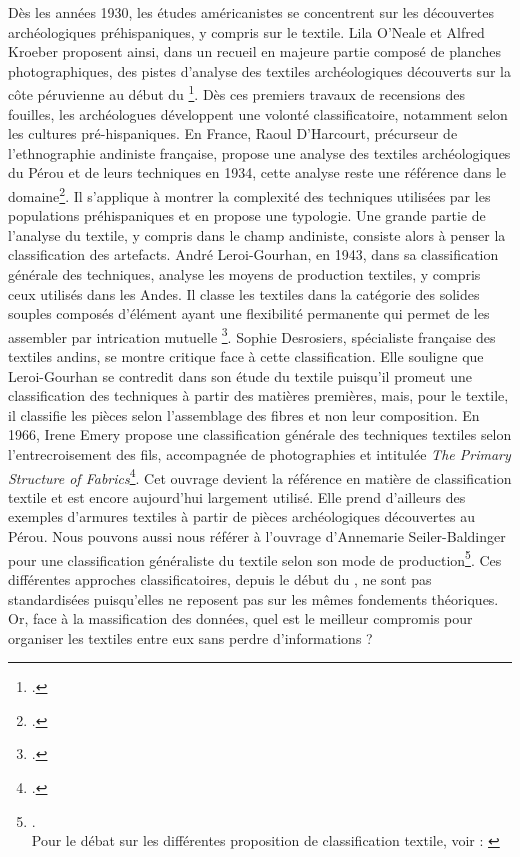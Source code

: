 Dès les années 1930, les études américanistes se concentrent sur les découvertes archéologiques préhispaniques, y compris sur le textile. Lila O'Neale et Alfred Kroeber proposent ainsi, dans un recueil en majeure partie composé de planches photographiques, des pistes d'analyse des textiles archéologiques découverts sur la côte péruvienne au début du \footcite{onealeTextilePeriodsAncient1930}. 
Dès ces premiers travaux de recensions des fouilles, les archéologues développent une volonté classificatoire, notamment selon les cultures pré-hispaniques. En France, Raoul D'Harcourt, précurseur de l'ethnographie andiniste française, propose une analyse des textiles archéologiques du Pérou et de leurs techniques en 1934, cette analyse reste une référence dans le domaine\footcite{harcourtTextilesAnciensPerou2008}. Il s'applique à montrer la complexité des techniques utilisées par les populations préhispaniques et en propose une typologie. Une grande partie de l'analyse du textile, y compris dans le champ andiniste, consiste alors à penser la classification des artefacts. André Leroi-Gourhan, en 1943, dans sa classification générale des techniques, analyse les moyens de production textiles, y compris ceux utilisés dans les Andes. Il classe les textiles dans la catégorie des \og solides souples \fg\:composés d'élément ayant une \og flexibilité permanente qui permet de les assembler par intrication mutuelle \fg \footcite[p.~243]{leroi-gourhanHommeMatiereEvolution1943}. 
Sophie Desrosiers, spécialiste française des textiles andins, se montre critique face à cette classification. Elle souligne que Leroi-Gourhan se contredit dans son étude du textile puisqu'il promeut une classification des techniques à partir des matières premières, mais, pour le textile, il classifie les pièces selon l'assemblage des fibres et non leur composition. En 1966, Irene Emery propose une classification générale des techniques textiles selon l'entrecroisement des fils, accompagnée de photographies et intitulée \textit{The Primary Structure of Fabrics}\footcite{emeryPrimaryStructuresFabrics1995}. Cet ouvrage devient la référence en matière de classification textile et est encore aujourd'hui largement utilisé. Elle prend d'ailleurs des exemples d'armures textiles à partir de pièces archéologiques découvertes au Pérou. Nous pouvons aussi nous référer à l'ouvrage d'Annemarie Seiler-Baldinger pour une classification généraliste du textile selon son mode de production\footnote{\cite{seiler-baldingerTextilesClassificationTechniques1995}.\\Pour le débat sur les différentes proposition de classification textile, voir : \cite{balfetOuSontClassifications1988}}. Ces différentes approches classificatoires, depuis le début du , ne sont pas standardisées puisqu'elles ne reposent pas sur les mêmes fondements théoriques. Or, face à la massification des données, quel est le meilleur compromis pour organiser les textiles entre eux sans perdre d'informations ? 

